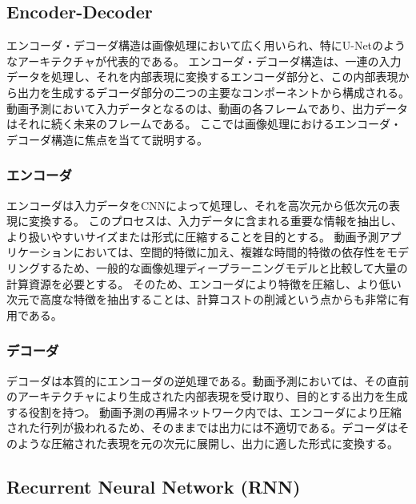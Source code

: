     \subsection{Encoder-Decoder}
      エンコーダ・デコーダ構造は画像処理において広く用いられ、特にU-Netのようなアーキテクチャが代表的である。
      エンコーダ・デコーダ構造は、一連の入力データを処理し、それを内部表現に変換するエンコーダ部分と、この内部表現から出力を生成するデコーダ部分の二つの主要なコンポーネントから構成される。
      動画予測において入力データとなるのは、動画の各フレームであり、出力データはそれに続く未来のフレームである。
      ここでは画像処理におけるエンコーダ・デコーダ構造に焦点を当てて説明する。
        
      \subsubsection{エンコーダ}
        エンコーダは入力データをCNNによって処理し、それを高次元から低次元の表現に変換する。
        このプロセスは、入力データに含まれる重要な情報を抽出し、より扱いやすいサイズまたは形式に圧縮することを目的とする。
        動画予測アプリケーションにおいては、空間的特徴に加え、複雑な時間的特徴の依存性をモデリングするため、一般的な画像処理ディープラーニングモデルと比較して大量の計算資源を必要とする。
        そのため、エンコーダにより特徴を圧縮し、より低い次元で高度な特徴を抽出することは、計算コストの削減という点からも非常に有用である。
        
      \subsubsection{デコーダ}
        デコーダは本質的にエンコーダの逆処理である。動画予測においては、その直前のアーキテクチャにより生成された内部表現を受け取り、目的とする出力を生成する役割を持つ。
        動画予測の再帰ネットワーク内では、エンコーダにより圧縮された行列が扱われるため、そのままでは出力には不適切である。デコーダはそのような圧縮された表現を元の次元に展開し、出力に適した形式に変換する。

    
    
    \subsection{Recurrent Neural Network (RNN)}


